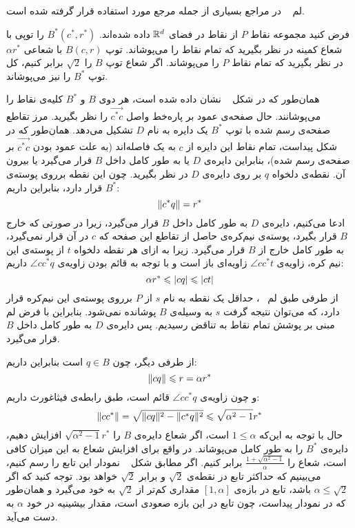 
لم ~ در مراجع بسیاری از جمله مرجع  مورد استفاده قرار گرفته شده است.



فرض کنید مجموعه نقاط $P$ از نقاط در فضای $\mathbb{R}^d$ داده شده‌اند. $B^*(c^*, r^*)$ را توپی با شعاع کمینه در نظر بگیرید که تمام نقاط را می‌پوشاند. توپ $B(c, r)$ با شعاعی $\alpha r^*$ در نظر بگیرید که تمام نقاط $P$ را می‌پوشاند. اگر شعاع توپ $B$ را $\sqrt{2}$ برابر کنیم، کل توپ $B^*$ را نیز می‌پوشاند. 


همان‌طور که در شکل ~ نشان داده شده است، هر دوی $B$ و $B^*$ کلیه‌ی نقاط را می‌پوشانند. حال صفحه‌ی عمود بر پاره‌خط واصل $\vec{c^*c}$ را نظر بگیرید. مرز تقاطع صفحه‌ی رسم شده با توپ $B^*$ یک دایره به نام $D$ تشکیل می‌دهد. همان‌طور که در شکل پیداست، تمام نقاط این دایره از $c$ به یک فاصله‌اند (به علت عمود بودن $\vec{c^*c}$ بر صفحه‌ی رسم شده)، بنابراین دایره‌ی $D$ یا به طور کامل داخل $B$ قرار می‌گیرد یا بیرون آن. نقطه‌ی دلخواه $q$ بر روی دایره‌ی $D$ در نظر بگیرید. چون این نقطه برروی پوسته‌ی $B^*$ قرار دارد، بنابراین داریم:
$$\|{c^* q}\| = r^*$$
ادعا می‌کنیم، دایره‌ی $D$ به طور کامل داخل $B$ قرار می‌گیرد، زیرا در صورتی که خارج $B$ قرار بگیرد، پوسته‌ی نیم‌کره‌ی حاصل از تقاطع این صفحه که $c$ در آن قرار نمی‌گیرد، به طور کامل خارج از $B$ قرار می‌گیرد. زیرا به ازای هر نقطه دلخواه $t$ از پوسته‌ی این نیم کره، زاویه‌ی $\angle{cc^*t}$ زاویه‌ای باز است و با توجه به قائم بودن زاویه‌ی $\angle{cc^*q}$ داریم:
$$\alpha r^* \leqslant \left|{cq}\right| \leqslant \left|{ct}\right|$$
 از طرفی طبق‌ لم ~، حداقل یک نقطه‌ به نام $s$ از $P$ برروی پوسته‌ی این نیم‌کره قرار دارد، که می‌توان نتیجه گرفت $s$ به وسیله‌ی $B$ پوشانده نمی‌شود. بنابراین با فرض لم مبنی بر پوشش تمام نقاط به تناقض رسیدیم. پس دایره‌ی $D$ به طور کامل داخل $B$ قرار می‌گیرد. 

از طرفی دیگر، چون $q \in B$ است بنابراین داریم:
$$\|{c q}\| \leqslant r = \alpha r^*$$
و چون زاویه‌ی $\angle{cc^*q}$ قائم است، طبق‌ رابطه‌ی فیثاغورث داریم:
$$\|{cc^*}\| = \sqrt{\|{cq}\|^2 - \|{c^*q}\|^2} \leqslant \sqrt{\alpha^2 - 1} r^*$$
حال با توجه به این‌که $1 \leq \alpha$ است، اگر شعاع دایره‌ی $B$ را $\sqrt{\alpha ^ 2 - 1}r^*$ افزایش دهیم، دایره‌ی $B^*$ را به طور کامل می‌پوشاند. در واقع برای افزایش شعاع به این میزان کافی است، شعاع را $\frac{1 + \sqrt{\alpha ^ 2 - 1}}{\alpha}$ برابر کنیم. اگر مطابق شکل ~ نمودار این تابع را رسم کنیم، می‌بینیم که حداکثر تابع در نقطه‌ی $\sqrt{2}$ و برابر $\sqrt{2}$ خواهد بود. توجه کنید که اگر $\alpha \leq \sqrt{2}$ باشد، تابع در بازه‌ی $[1, \alpha]$ مقداری کم‌تر از $\sqrt{2}$ به خود می‌گیرد و همان‌طور که در نمودار پیداست، چون تابع در این بازه صعودی است، مقدار بیشینیه در خود $\alpha$ به دست می‌آید.

